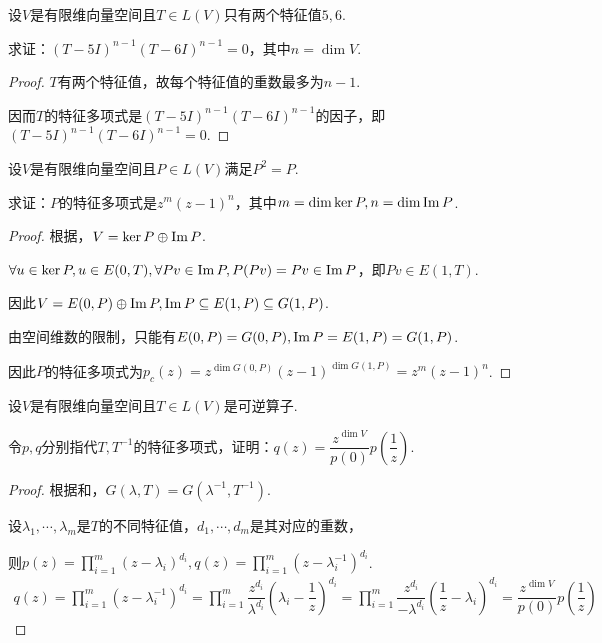 \begin{problem}[2]\label{8.C.2}
    设\(V\)是有限维向量空间且\(T \in L(V)\)只有两个特征值\(5,6\).

    求证：\((T-5I)^{n-1}(T-6I)^{n-1}=0\)，其中\(n=\dim V\).
\end{problem}

\begin{proof}
    \(T\)有两个特征值，故每个特征值的重数最多为\(n-1\).

    因而\(T\)的特征多项式是\((T-5I)^{n-1}(T-6I)^{n-1}\)的因子，即\((T-5I)^{n-1}(T-6I)^{n-1}=0\).
\end{proof}

\begin{problem}[7]\label{8.C.7}
    设\(V\)是有限维向量空间且\(P \in L(V)\)满足\(P^2=P\).

    求证：\(P\)的特征多项式是\(z^m(z-1)^n\)，其中\(m=\dim \ker P,n=\dim \operatorname{Im} P\).
\end{problem}

\begin{proof}
    根据，\(V=\ker P \oplus \operatorname{Im} P\).

    \(\forall u \in \ker P,u \in E(0,T), \forall Pv \in \operatorname{Im} P,P(Pv)=Pv \in \operatorname{Im} P\)，即\(Pv \in E(1,T)\).
    
    因此\(V=E(0,P) \oplus \operatorname{Im} P,\operatorname{Im} P \subseteq E(1,P) \subseteq G(1,P)\).
    
    由空间维数的限制，只能有\(E(0,P)=G(0,P),\operatorname{Im} P=E(1,P)=G(1,P)\).
    
    因此\(P\)的特征多项式为\(p_c(z)=z^{\dim G(0,P)}(z-1)^{\dim G(1,P)}=z^m(z-1)^n\).
\end{proof}

\newpage

\begin{problem}[10]\label{8.C.10}
    设\(V\)是有限维向量空间且\(T \in L(V)\)是可逆算子.

    令\(p,q\)分别指代\(T,T^{-1}\)的特征多项式，证明：\(q(z)=\dfrac{z^{\dim V}}{p(0)}p(\dfrac{1}{z})\).
\end{problem}

\begin{proof}
    根据和，\(G(\lambda,T)=G(\lambda^{-1},T^{-1})\).

    设\(\lambda_1,\cdots,\lambda_m\)是\(T\)的不同特征值，\(d_1,\cdots,d_m\)是其对应的重数，
    
    则\(p(z)=\prod_{i=1}^m (z-\lambda_i)^{d_i},q(z)=\prod_{i=1}^m (z-\lambda_i^{-1})^{d_i}\).
    \begin{align*}
        q(z)=\prod_{i=1}^m (z-\lambda_i^{-1})^{d_i}
            =\prod_{i=1}^m \dfrac{z^{d_i}}{\lambda^{d_i}}(\lambda_i-\dfrac{1}{z})^{d_i}
            =\prod_{i=1}^m \dfrac{z^{d_i}}{-\lambda^{d_i}}(\dfrac{1}{z}-\lambda_i)^{d_i}
            =\dfrac{z^{\dim V}}{p(0)}p(\dfrac{1}{z})
    \end{align*}
\end{proof}

